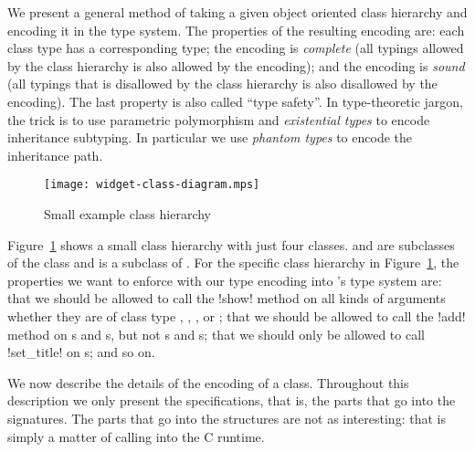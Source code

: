 \documentclass[finalversion]{usetex-v1}
\begin{document}
We present a general method of taking a given
object oriented class hierarchy and encoding it in the \sml
type system.  The properties of the resulting encoding are: each
class type has a corresponding \sml type; the encoding is
\emph{complete} (all typings allowed by the class
hierarchy is also allowed by the encoding); and the encoding is
\emph{sound} (all typings that is disallowed by the class
hierarchy is also disallowed by the encoding).  The last property is
also called ``type safety''.  In type-theoretic jargon, the trick is to
use parametric polymorphism and \emph{existential types} to encode
inheritance subtyping.  In particular we use \emph{phantom types} to
encode the inheritance path.


\begin{figure}[htp]
  \centering
  \texttt{[image: widget-class-diagram.mps]}
  \caption{Small example class hierarchy}
  \label{fig:class-hierarchy}
\end{figure}

Figure~\ref{fig:class-hierarchy} shows a small class hierarchy with
just four classes.  and  are
subclasses of the class  and  is a
subclass of .  For the specific class hierarchy
in Figure~\ref{fig:class-hierarchy}, the properties we want to enforce
with our type encoding into \sml's type system are: that we should be
allowed to call the !show! method on all kinds of arguments whether
they are of class type , ,
, or ; that we should be
allowed to call the !add! method on s and
s, but not s and
s; that we should only be allowed to call !set_title!
on s; and so on.

We now describe the details of the encoding of a class.
Throughout this description we only present the \sml specifications,
that is, the parts that go into the signatures. The parts that go into
the structures are not as interesting: that is simply a matter of
calling into the C runtime.
\end{document}
